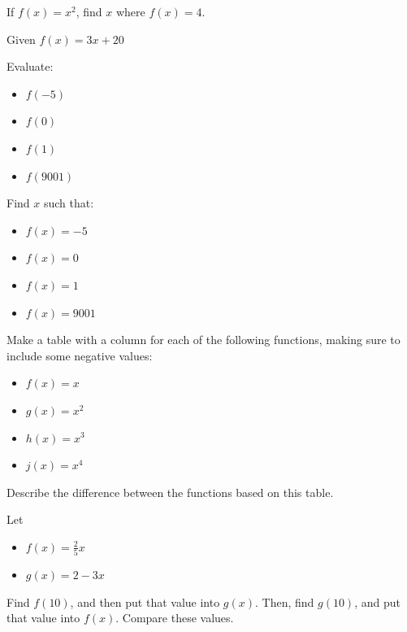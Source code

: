 \begin{exercise}
If $f(x) = x^2$, find $x$ where $f(x) = 4$.
\end{exercise}
\bigskip

\begin{exercise}

Given $f(x) = 3x + 20$
	\begin{multicols}{2}
		Evaluate:
		\begin{itemize}
		\item $f(-5)$
		\item $f(0)$
		\item $f(1)$
		\item $f(9001)$
	\end{itemize}
	\columnbreak
		

		Find $x$ such that:
		\begin{itemize}
		\item $f(x)=-5$
		\item $f(x)=0$
		\item $f(x)=1$
		\item $f(x)=9001$
	\end{itemize}
\end{multicols}

\end{exercise}

\bigskip

\begin{exercise}
Make a table with a column for each of the following functions, making sure to include some negative values:

\begin{itemize}
\item $f(x) = x$
\item $g(x) = x^2$
\item $h(x) = x^3$
\item $j(x) = x^4$
\end{itemize}

Describe the difference between the functions based on this table.

\end{exercise}
\bigskip

\pagebreak

\begin{exercise}

Let 
\begin{itemize}
\item $f(x) = \frac{2}{5}x$
\item $g(x) = 2 - 3x$
\end{itemize}

\noindent
Find $f(10)$, and then put that value into $g(x)$.  Then, find $g(10)$, and put that value into $f(x)$.  Compare these values.

\end{exercise}

